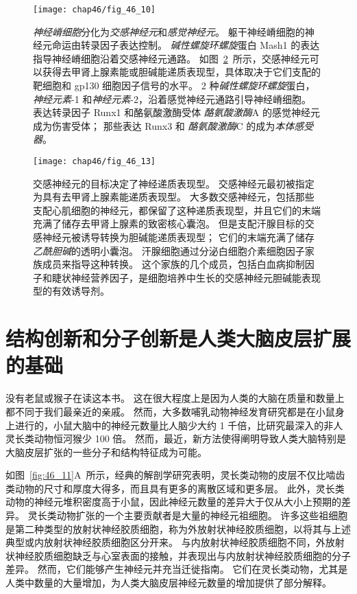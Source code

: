 \begin{figure}[htbp]
	\centering
	\texttt{[image: chap46/fig\_46\_10]}
	\caption{\textit{神经嵴细胞}分化为\textit{交感神经元}和\textit{感觉神经元}。
		躯干神经嵴细胞的神经元命运由转录因子表达控制。
		\textit{碱性螺旋环螺旋}蛋白 Mash1 的表达指导神经嵴细胞沿着交感神经元通路。
		如图~\ref{fig:46_13}~所示，交感神经元可以获得去甲肾上腺素能或胆碱能递质表现型，具体取决于它们支配的靶细胞和 gp130 细胞因子信号的水平。
		2 种\textit{碱性螺旋环螺旋}蛋白，\textit{神经元素}-1 和\textit{神经元素}-2，沿着感觉神经元通路引导神经嵴细胞。
		表达转录因子 Runx1 和酪氨酸激酶受体 \textit{酪氨酸激酶}A 的感觉神经元成为伤害受体；
		那些表达 Runx3 和 \textit{酪氨酸激酶}C 的成为\textit{本体感受器}。}
	\label{fig:46_10}
\end{figure}


\begin{figure}[htbp]
	\centering
	\texttt{[image: chap46/fig\_46\_13]}
	\caption{交感神经元的目标决定了神经递质表现型。
		交感神经元最初被指定为具有去甲肾上腺素能递质表现型。
		大多数交感神经元，包括那些支配心肌细胞的神经元，都保留了这种递质表现型，并且它们的末端充满了储存去甲肾上腺素的致密核心囊泡。
		但是支配汗腺目标的交感神经元被诱导转换为胆碱能递质表现型；
		它们的末端充满了储存\textit{乙酰胆碱}的透明小囊泡。
		汗腺细胞通过分泌白细胞介素细胞因子家族成员来指导这种转换。
		这个家族的几个成员，包括白血病抑制因子和睫状神经营养因子，是细胞培养中生长的交感神经元胆碱能表现型的有效诱导剂。}
	\label{fig:46_13}
\end{figure}



\section{结构创新和分子创新是人类大脑皮层扩展的基础}

没有老鼠或猴子在读这本书。
这在很大程度上是因为人类的大脑在质量和数量上都不同于我们最亲近的亲戚。
然而，大多数哺乳动物神经发育研究都是在小鼠身上进行的，小鼠大脑中的神经元数量比人脑少大约 1 千倍，比研究最深入的非人灵长类动物恒河猴少 100 倍。
然而，最近，新方法使得阐明导致人类大脑特别是大脑皮层扩张的一些分子和结构特征成为可能。


如图~\ref{fig:46_11}A~所示，经典的解剖学研究表明，灵长类动物的皮层不仅比啮齿类动物的尺寸和厚度大得多，而且具有更多的离散区域和更多层。
此外，灵长类动物的神经元堆积密度高于小鼠，因此神经元数量的差异大于仅从大小上预期的差异。
灵长类动物扩张的一个主要贡献者是大量的神经元祖细胞。
许多这些祖细胞是第二种类型的放射状神经胶质细胞，称为外放射状神经胶质细胞，以将其与上述典型或内放射状神经胶质细胞区分开来。
与内放射状神经胶质细胞不同，外放射状神经胶质细胞缺乏与心室表面的接触，并表现出与内放射状神经胶质细胞的分子差异。
然而，它们能够产生神经元并充当迁徙指南。
它们在灵长类动物，尤其是人类中数量的大量增加，为人类大脑皮层神经元数量的增加提供了部分解释。


